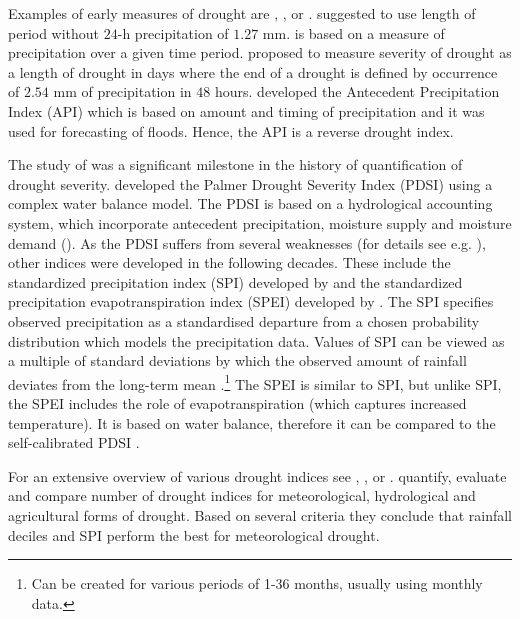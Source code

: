 \documentclass[a4paper,12pt]{article}
\begin{document}
Examples of early measures of drought are \cite{wilhite1985}, \cite{munger1916}, \cite{blumenstock1942} or \cite{mcquigg1954}. \cite{munger1916} suggested to use length of period without $24$-h precipitation of $1.27$ mm. \cite{wilhite1985} is based on a measure of precipitation over a given time period. \cite{blumenstock1942} proposed to measure severity of drought as a length of drought in days where the end of a drought is defined by occurrence of $2.54$ mm of precipitation in $48$ hours. \cite{mcquigg1954} developed the Antecedent Precipitation Index (API) which is based on amount and timing of precipitation and it was used for forecasting of floods. Hence, the API is a reverse drought index.

The study of \cite{palmer1965} was a significant milestone in the history of quantification of drought severity. \cite{palmer1965} developed the Palmer Drought Severity Index (PDSI) using a complex water balance model. The PDSI is based on a hydrological accounting system, which incorporate antecedent precipitation, moisture supply and moisture demand (\citealp{Heim2002,palmer1965}). As the PDSI suffers from several weaknesses (for details see e.g. \citealt{Heim2002}), other indices were developed in the following decades. These include the standardized precipitation index (SPI) developed by \cite{SPI} and the standardized precipitation evapotranspiration index (SPEI) developed by \cite{SPEI}. The SPI specifies observed precipitation as a standardised departure from a chosen probability distribution which models the precipitation data. Values of SPI can be viewed as a multiple of standard deviations by which the observed amount of rainfall deviates from the long-term mean \citep{SPIonline}.\footnote{Can be created for various periods of 1-36 months, usually using monthly data.} The SPEI is similar to SPI, but unlike SPI, the SPEI includes the role of evapotranspiration (which captures increased temperature). It is based on water balance, therefore it can be compared to the self-calibrated PDSI \citep{SPEI}. 


For an extensive overview of various drought indices see \cite{Heim2002}, \cite{monacelli2005}, \cite{svoboda2016} or \cite{zargar2011}. \cite{keyantash2002} quantify, evaluate and compare number of drought indices for meteorological, hydrological and agricultural forms of drought. Based on several criteria they conclude that rainfall deciles and SPI perform the best for meteorological drought.
\end{document}
